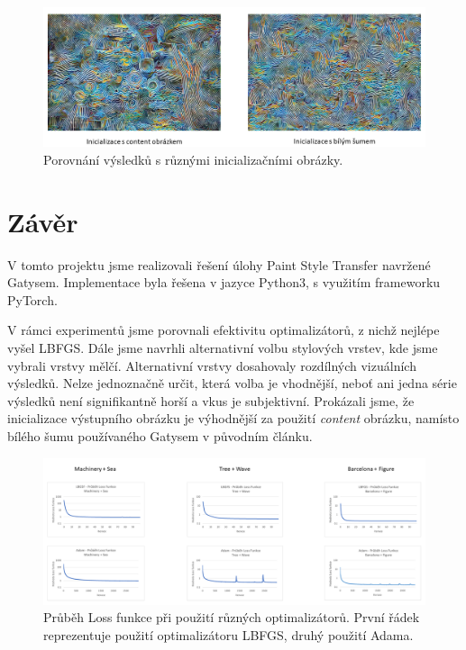 \documentclass[twocolumn]{article}
\begin{document}
		\begin{figure}[h]
		\includegraphics[width=\linewidth]{ContentNoise.png}
		\caption{Porovnání výsledků s různými inicializačními obrázky. }
		\label{Noise}
	\end{figure}
	
	\section*{Závěr}
	V tomto projektu jsme realizovali řešení úlohy Paint Style Transfer navržené Gatysem. Implementace byla řešena v jazyce Python3, s využitím frameworku PyTorch.
	\par
	V rámci experimentů jsme porovnali efektivitu optimalizátorů, z nichž nejlépe vyšel LBFGS. Dále jsme navrhli alternativní volbu stylových vrstev, kde jsme vybrali vrstvy mělčí. Alternativní vrstvy dosahovaly rozdílných vizuálních výsledků. Nelze jednoznačně určit, která volba je vhodnější, neboť ani jedna série výsledků není signifikantně horší a vkus je subjektivní. Prokázali jsme, že inicializace výstupního obrázku je výhodnější za použití \textit{content} obrázku, namísto bílého šumu používaného Gatysem v původním článku.
	

		\begin{figure}[t]
		\includegraphics[width=18cm]{Ex1G_lez.png}
		\caption{Průběh Loss funkce při použití různých optimalizátorů. První řádek reprezentuje použití optimalizátoru LBFGS, druhý použití Adama.}
		\label{exp1G}
	\end{figure}
	
\end{document}
